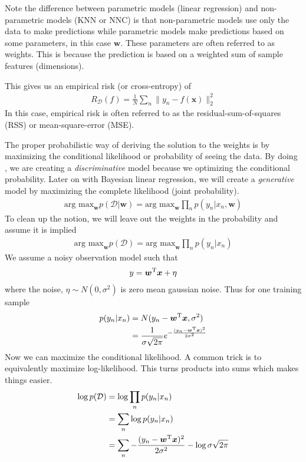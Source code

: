 \documentclass[11pt]{article}
\newcommand{\vct}[1]{\boldsymbol{#1}} %
\newcommand{\T}{^{\textrm T}} %
\begin{document}
Note the difference between parametric models (linear regression) and non-parametric models (KNN or NNC) is that non-parametric models use only the data to make predictions while parametric models make predictions based on some parameters, in this case $\vct{w}$. These parameters are often referred to as weights. This is because the prediction is based on a weighted sum of sample features (dimensions). 

This gives us an empirical risk (or cross-entropy) of
\begin{align*}
R_{\mathcal{D}}(f) = \frac{1}{N} \sum_n \|y_n - f(\vct{x})\|_2^2
\end{align*}
In this case, empirical risk is often referred to as the residual-sum-of-squares (RSS) or mean-square-error (MSE).

The proper probabilistic way of deriving the solution to the weights is by maximizing the conditional likelihood or probability of seeing the data. By doing , we are creating a {\it discriminative} model because we optimizing the conditional probability. Later on with Bayesian linear regression, we will create a {\it generative} model by maximizing the complete likelihood (joint probability). 
\begin{align*}
\text{arg max}_{\vct{w}} p(\mathcal{D}|\vct{w}) = \text{arg max}_{\vct{w}} \prod_n p(y_n|x_n,\vct{w})
\end{align*}
To clean up the notion, we will leave out the weights in the probability and assume it is implied
\begin{align*}
\text{arg max}_{\vct{w}} p(\mathcal{D}) = \text{arg max}_{\vct{w}} \prod_n p(y_n|x_n)
\end{align*}
We assume a noisy observation model such that
\begin{align*}
y = \vct{w}\T\vct{x} + \eta
\end{align*}
where the noise, $\eta \sim N(0,\sigma^2)$ is zero mean gaussian noise. Thus for one training sample
\begin{align*}
p(y_n|x_n) &= N(y_n - \vct{w}\T\vct{x}, \sigma^2)\\
&= \frac{1}{\sigma\sqrt{2\pi}}e^{-\frac{(y_n - \vct{w}\T\vct{x})^2}{2\sigma^2}}
\end{align*}
Now we can maximize the conditional likelihood. A common trick is to equivalently maximize log-likelihood. This turns products into sums which makes things easier.
\begin{align*}
\log p(\mathcal{D}) &=  \log \prod_n p(y_n|x_n)\\
&=  \sum_n \log p(y_n|x_n)\\
&=  \sum_n -\frac{(y_n - \vct{w}\T\vct{x})^2}{2\sigma^2} - \log\sigma\sqrt{2\pi}\\
\end{align*}
\end{document}
